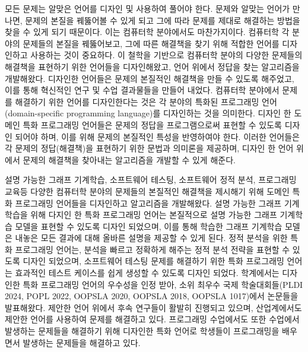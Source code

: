 \documentclass[11pt]{article}
\begin{document}
\begin{spacing}{1.145}
모든 문제는 알맞은 언어를 디자인 및 사용하여 풀어야 한다.
%
문제와 알맞는 언어가 만나면, 문제의 본질을 꿰뚫어볼 수 있게 되고 그에 따라 문제를 제대로 해결하는 방법을 찾을 수 있게 되기 때문이다.
%
이는 컴퓨터학 분야에서도 마찬가지이다.
%
컴퓨터학 각 분야의 문제들의 본질을 꿰뚫어보고, 그에 따른 해결책을 찾기 위해 적합한 언어를 디자인하고 사용하는 것이 중요하다.
%
이 철학을 기반으로 컴퓨터학 분야의 다양한 문제들의 해결책을 표현하기 위한 언어들을 디자인해왔고, 언어 위에서 정답을 찾는 알고리즘을 개발해왔다.
%
디자인한 언어들은 문제의 본질적인 해결책을 만들 수 있도록 해주었고, 이를 통해 혁신적인 연구 및 수업 결과물들을 만들어 내었다.
%
컴퓨터학 분야에서 문제를 해결하기 위한 언어를 디자인한다는 것은 각 분야의 특화된 프로그래밍 언어(domain-specific programming language)를 디자인하는 것을 의미한다.
%
디자인 한 도메인 특화 프로그래밍 언어들은 문제의 정답을 프로그램으로써 표현할 수 있도록 디자인 되어야 하며, 이를 위해 문제의 본질적인 특성을 반영하여야 한다.
%
이러한 언어들은 각 문제의 정답(해결책)을 표현하기 위한 문법과 의미론을 제공하며, 디자인 한 언어 위에서 문제의 해결책을 찾아내는 알고리즘을 개발할 수 있게 해준다.



설명 가능한 그래프 기계학습, 소프트웨어 테스팅, 소프트웨어 정적 분석, 프로그래밍 교육등 다양한 컴퓨터학 분야의 문제들의 본질적인 해결책을 제시해기 위해 도메인 특화 프로그래밍 언어들을 디자인하고 알고리즘을 개발해왔다.
%
설명 가능한 그래프 기계학습을 위해 다지인 한 특화 프로그래밍 언어는 본질적으로 설명 가능한 그래프 기계학습 모델을 표현할 수 있도록 디자인 되었으며, 이를 통해 학습한 그래프 기계학습 모델은 내놓은 모든 결과에 대해 올바른 설명을 제공할 수 있게 된다.
%
정적 분석을 위한 특화 프로그래밍 언어는, 분석을 빠르고 정확하게 해주는 정적 분석 전략을 표현할 수 있도록 디자인 되었으며, 소프트웨어 테스팅 문제를 해결하기 위한 특화 프로그래밍 언어는 효과적인 테스트 케이스를 쉽게 생성할 수 있도록 디자인 되었다.
%
학계에서는 디자인한 특화 프로그래밍 언어의 우수성을 인정 받아, 소위 최우수 국제 학술대회들(PLDI 2024, POPL 2022, OOPSLA 2020, OOPSLA 2018, OOPSLA 1017)에서 논문들을 발표해왔다.
%
제안한 언어 위에서 후속 연구들이 활발히 진행되고 있으며, 산업계에서도 제안한 언어를 사용하여 문제를 해결하고 있다.
%
프로그래밍 수업에서도 또한 수업에서 발생하는 문제들을 해결하기 위해 디자인한 특화 언어로 학생들이 프로그래밍을 배우면서 발생하는 문제들을 해결하고 있다.






\end{spacing}
\end{document}
